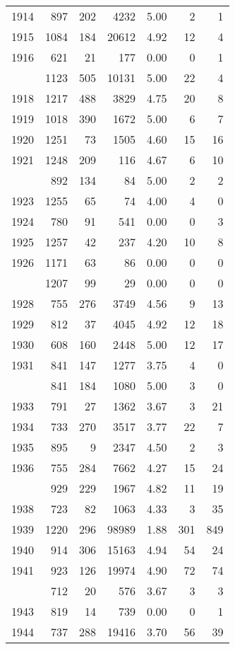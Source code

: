 \documentclass[
]{article}
\begin{document}
\begin{table}
\begin{tabular}[t]{lrrrrrr}
1914 & 897 & 202 & 4232 & 5.00 & 2 & 1\\
1915 & 1084 & 184 & 20612 & 4.92 & 12 & 4\\
1916 & 621 & 21 & 177 & 0.00 & 0 & 1\\
\addlinespace
1917 & 1123 & 505 & 10131 & 5.00 & 22 & 4\\
1918 & 1217 & 488 & 3829 & 4.75 & 20 & 8\\
1919 & 1018 & 390 & 1672 & 5.00 & 6 & 7\\
1920 & 1251 & 73 & 1505 & 4.60 & 15 & 16\\
1921 & 1248 & 209 & 116 & 4.67 & 6 & 10\\
\addlinespace
1922 & 892 & 134 & 84 & 5.00 & 2 & 2\\
1923 & 1255 & 65 & 74 & 4.00 & 4 & 0\\
1924 & 780 & 91 & 541 & 0.00 & 0 & 3\\
1925 & 1257 & 42 & 237 & 4.20 & 10 & 8\\
1926 & 1171 & 63 & 86 & 0.00 & 0 & 0\\
\addlinespace
1927 & 1207 & 99 & 29 & 0.00 & 0 & 0\\
1928 & 755 & 276 & 3749 & 4.56 & 9 & 13\\
1929 & 812 & 37 & 4045 & 4.92 & 12 & 18\\
1930 & 608 & 160 & 2448 & 5.00 & 12 & 17\\
1931 & 841 & 147 & 1277 & 3.75 & 4 & 0\\
\addlinespace
1932 & 841 & 184 & 1080 & 5.00 & 3 & 0\\
1933 & 791 & 27 & 1362 & 3.67 & 3 & 21\\
1934 & 733 & 270 & 3517 & 3.77 & 22 & 7\\
1935 & 895 & 9 & 2347 & 4.50 & 2 & 3\\
1936 & 755 & 284 & 7662 & 4.27 & 15 & 24\\
\addlinespace
1937 & 929 & 229 & 1967 & 4.82 & 11 & 19\\
1938 & 723 & 82 & 1063 & 4.33 & 3 & 35\\
1939 & 1220 & 296 & 98989 & 1.88 & 301 & 849\\
1940 & 914 & 306 & 15163 & 4.94 & 54 & 24\\
1941 & 923 & 126 & 19974 & 4.90 & 72 & 74\\
\addlinespace
1942 & 712 & 20 & 576 & 3.67 & 3 & 3\\
1943 & 819 & 14 & 739 & 0.00 & 0 & 1\\
1944 & 737 & 288 & 19416 & 3.70 & 56 & 39\\

\end{tabular}
\end{table}
\end{document}
